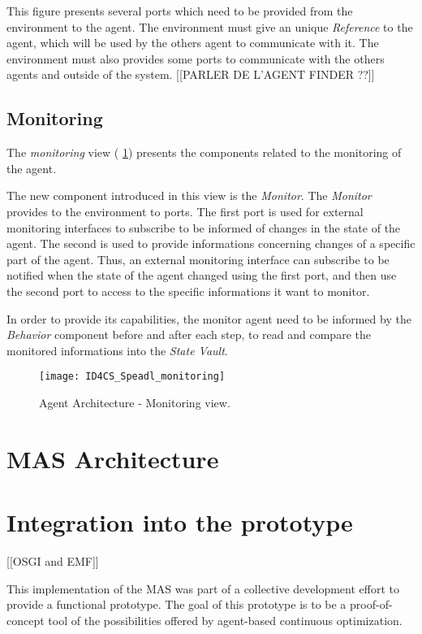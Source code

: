 This figure presents several ports which need to be provided from the environment to the agent. The environment must give an unique \emph{Reference} to the agent, which will be used by the others agent to communicate with it. The environment must also provides some ports to communicate with the others agents and outside of the system.
[[PARLER DE L'AGENT FINDER ??]]

\subsection{Monitoring}

The \emph{monitoring} view (\figurename{} \ref{Arch-monitor}) presents the components related to the monitoring of the agent. 

The new component introduced in this view is the \emph{Monitor}. The \emph{Monitor} provides to the environment to ports. The first port is used for external monitoring interfaces to subscribe to be informed of changes in the state of the agent. The second is used to provide informations concerning changes of a specific part of the agent. Thus, an external monitoring interface can subscribe to be notified when the state of the agent changed using the first port, and then use the second port to access to the specific informations it want to monitor.

In order to provide its capabilities, the monitor agent need to be informed by the \emph{Behavior} component before and after each step, to read and compare the monitored informations into the \emph{State Vault}.

\begin{figure}
\centering
\texttt{[image: ID4CS\_Speadl\_monitoring]}
\caption{Agent Architecture - Monitoring view.}
\label{Arch-monitor}
\end{figure}

\section{MAS Architecture}

\section{Integration into the prototype}

[[OSGI and EMF]]

This implementation of the MAS was part of a collective development effort to provide a functional prototype. The goal of this prototype is to be a proof-of-concept tool of the possibilities offered by agent-based continuous optimization.


